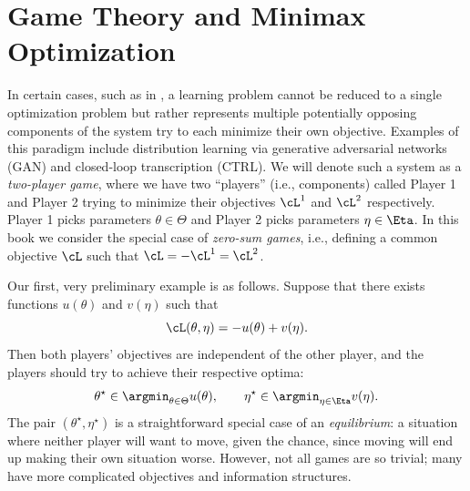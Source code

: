 \documentclass[../../book-main.tex]{subfiles}
\begin{document}
\section{Game Theory and Minimax Optimization} \label{sec:minimax}\label{sec:game_theory}

In certain cases, such as in , a learning problem cannot be reduced to a single optimization problem but rather represents multiple potentially opposing components of the system try to each minimize their own objective. Examples of this paradigm include distribution learning via generative adversarial networks (GAN) and closed-loop transcription (CTRL). We will denote such a system as a \textit{two-player game}, where we have two ``players'' (i.e., components) called Player 1 and Player 2 trying to minimize their objectives \(\cL^{1}\) and \(\cL^{2}\) respectively. Player 1 picks parameters \(\theta \in \Theta\) and Player 2 picks parameters \(\eta \in \Eta\). In this book we consider the special case of \textit{zero-sum games}, i.e., defining a common objective \(\cL\) such that \(\cL = -\cL^{1} = \cL^{2}\).

Our first, very preliminary example is as follows. Suppose that there exists functions \(u(\theta)\) and \(v(\eta)\) such that 
\begin{equation}
    \cL(\theta, \eta) = -u(\theta) + v(\eta).
\end{equation}
Then both players' objectives are independent of the other player, and the players should try to achieve their respective optima:
\begin{equation}
    \theta^{\star} \in \argmin_{\theta \in \Theta}u(\theta), \qquad \eta^{\star} \in \argmin_{\eta \in \Eta}v(\eta).
\end{equation}
The pair \((\theta^{\star}, \eta^{\star})\) is a straightforward special case of an \textit{equilibrium}: a situation where neither player will want to move, given the chance, since moving will end up making their own situation worse. However, not all games are so trivial; many have more complicated objectives and information structures.
\end{document}
